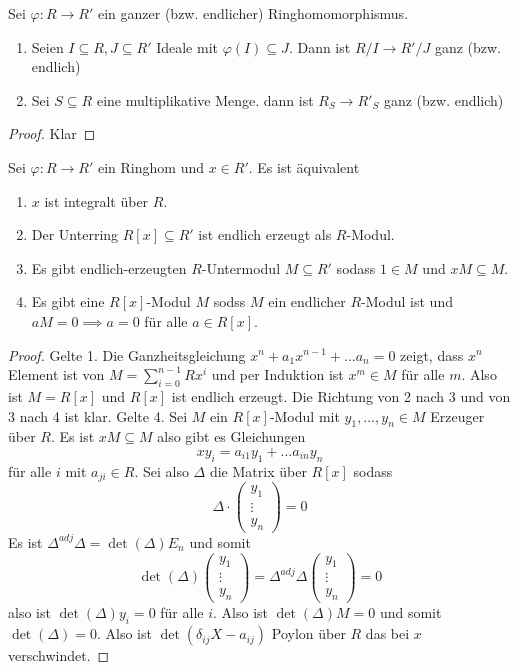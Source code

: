 \begin{Lemma}
    Sei \(\varphi\colon R\to R'\) ein ganzer (bzw. endlicher) Ringhomomorphismus.
    \begin{enumerate}
        \item Seien \(I\subseteq R,J\subseteq R'\) Ideale mit \(\varphi(I)\subseteq J\). Dann ist \(R/I\to R'/J\) ganz (bzw. endlich)
        \item Sei \(S\subseteq R\) eine multiplikative Menge. dann ist \(R_S\to R'_S\) ganz (bzw. endlich)
    \end{enumerate}
\end{Lemma}
\begin{proof}
    Klar
\end{proof}
\begin{Lemma}
    Sei \(\varphi\colon R\to R'\) ein Ringhom und \(x\in R'\). Es ist äquivalent
    \begin{enumerate}
        \item \(x\) ist integralt über \(R\).
        \item Der Unterring \(R[x]\subseteq R'\) ist endlich erzeugt als \(R\)-Modul.
        \item Es gibt endlich-erzeugten \(R\)-Untermodul \(M\subseteq R'\) sodass \(1\in M\) und \(xM\subseteq M\).
        \item Es gibt eine \(R[x]\)-Modul \(M\) sodss \(M\) ein endlicher \(R\)-Modul ist und \(aM=0\implies a=0\) für alle \(a\in R[x]\).
    \end{enumerate}
\end{Lemma}
\begin{proof}
    Gelte 1. Die Ganzheitsgleichung \(x^n+a_1x^{n-1}+\dots a_n=0\) zeigt, dass \(x^n\) Element ist von \(M=\sum_{i=0}^{n-1}Rx^i\) und per Induktion ist \(x^m\in M\) für alle \(m\).
    Also ist \(M=R[x]\) und \(R[x]\) ist endlich erzeugt. Die Richtung von 2 nach 3 und von 3 nach 4 ist klar.
    Gelte 4. Sei \(M\) ein \(R[x]\)-Modul mit \(y_1,\dots,y_n\in M\) Erzeuger über \(R\).
    Es ist \(xM\subseteq M\) also gibt es Gleichungen 
    \[xy_i=a_{i1}y_1+\dots a_{in}y_n\] für alle \(i\) mit \(a_{ji}\in R\).
    Sei also \(\Delta\) die Matrix über \(R[x]\) sodass 
    \[\Delta\cdot\begin{pmatrix}
        y_1\\ \vdots \\ y_n
    \end{pmatrix}=0\]
    Es ist \(\Delta^{adj}\Delta=\det(\Delta)E_n\) und somit 
    \[\det(\Delta)\begin{pmatrix}
        y_1\\ \vdots \\y_n
    \end{pmatrix}=\Delta^{adj}\Delta\begin{pmatrix}
        y_1\\ \vdots \\y_n
    \end{pmatrix}=0\] also ist \(\det(\Delta)y_i=0\) für alle \(i\).
    Also ist \(\det(\Delta)M=0\) und somit \(\det(\Delta)=0\).
    Also ist \(\det(\delta_{ij}X-a_{ij})\) Poylon über \(R\) das bei \(x\) verschwindet.
    
\end{proof}
